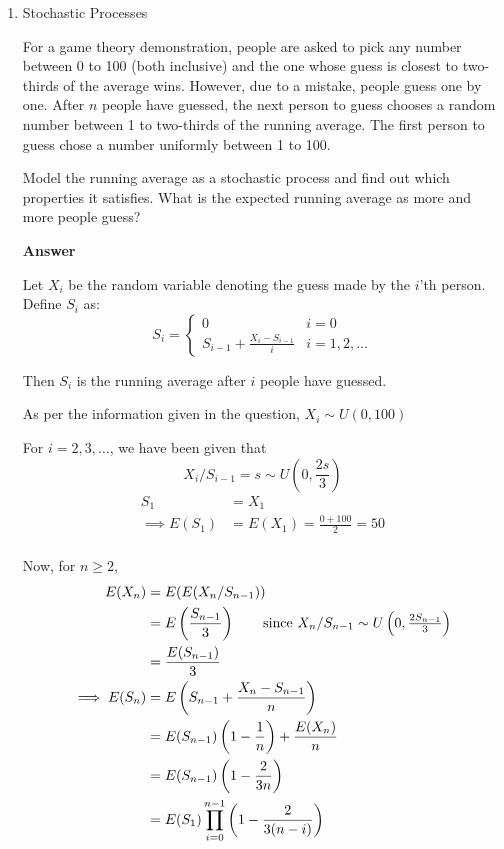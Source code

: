 \documentclass[12pt, oneside]{article}
\begin{document}
\begin{enumerate}
\item {
    Stochastic Processes

    For a game theory demonstration, people are asked to pick any number between 0 to 100
    (both inclusive) and the one whose guess is closest to two-thirds of the average wins.
    However, due to a mistake, people guess one by one. After \(n\) people have guessed,
    the next person to guess chooses a random number between 1 to two-thirds of the running
    average. The first person to guess chose a number uniformly between 1 to 100.

    Model the running average as a stochastic process and find out which properties 
    it satisfies. What is the expected running average as more and more people guess?

    \textbf{Answer}

    Let \(X_i\) be the random variable denoting the guess made by the \(i\)'th person.
    Define \(S_i\) as:
    \[
        S_i = \begin{cases}
            0 & i = 0 \\
            S_{i-1} + \frac{X_i - S_{i - 1}}{i} & i = 1, 2, \ldots
        \end{cases}
    \]

    Then \(S_i\) is the running average after \(i\) people have guessed.
    
    As per the information given in the question, \(X_i \sim U(0, 100)\)

    For \(i = 2, 3, \ldots\), we have been given that
    \[X_i / S_{i - 1} = s \sim U\left(0, \frac{2s}{3}\right) \]
    \begin{align*}
        S_1 &= X_1 \\
        \implies E(S_1) &= E(X_1) = \frac{0 + 100}{2} = 50 \\
    \end{align*}

    Now, for \(n \geq 2\),
    \begin{align*}
        E(X_n) &= E(E(X_n / S_{n-1})) \\
               &= E\left(\frac{S_{n-1}}{3}\right) \tag*{since \(X_n / S_{n-1} \sim U\left(0, \frac{2S_{n-1}}{3}\right)\)}\\
               &= \frac{E(S_{n-1})}{3} \\
        \implies E(S_n) &= E\left(S_{n-1} + \frac{X_n - S_{n-1}}{n}\right) \\
                        &= E(S_{n-1})\left(1 - \frac{1}{n}\right)+ \frac{E(X_n)}{n} \\
                        &= E(S_{n - 1}) \left(1 - \frac{2}{3n}\right) \\
                        &= E(S_1) \prod_{i = 0}^{n-1}\left(1 - \frac{2}{3(n-i)}\right) \\
    \end{align*}

}
\end{enumerate}
\end{document}
